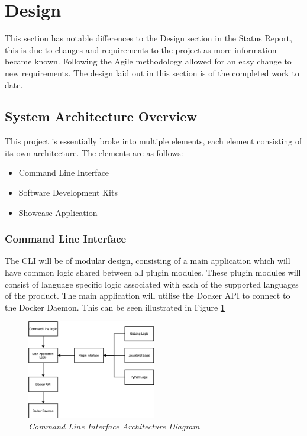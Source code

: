 \newpage
\section{Design}
\label{sub:design}
This section has notable differences to the Design section in the Status Report, this is due to changes and requirements to the project as more information became known. Following the Agile methodology allowed for an easy change to new requirements. The design laid out in this section is of the completed work to date.

\subsection{System Architecture Overview}
This project is essentially broke into multiple elements, each element consisting of its own architecture. The elements are as follows:
\begin{itemize}
    \item Command Line Interface
    \item Software Development Kits
    \item Showcase Application
\end{itemize}

\subsubsection{Command Line Interface}
The CLI will be of modular design, consisting of a main application which will have common logic shared between all plugin modules. These plugin modules will consist of language specific logic associated with each of the supported languages of the product. The main application will utilise the Docker API to connect to the Docker Daemon. This can be seen illustrated in Figure \ref{img:cli-overview}

\begin{figure}[!ht]
\centering
\includegraphics*[width=0.5\textwidth]{images/cli-arch.png}
\caption{\em Command Line Interface Architecture Diagram}
\label{img:cli-overview}
\end{figure}


